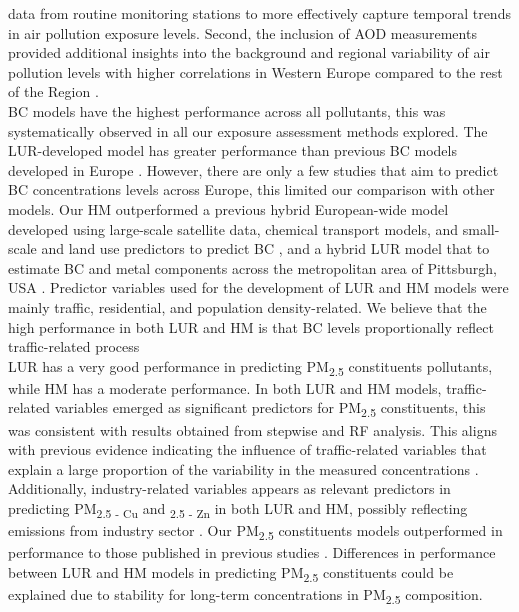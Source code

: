 \documentclass{article}
\begin{document}
data from routine monitoring stations to more effectively capture temporal trends in air pollution exposure levels. Second, the inclusion of AOD measurements provided additional insights into the background and regional variability of air pollution levels with higher correlations in Western Europe compared to the rest of the Region \cite{chen2024}.\\

BC models have the highest performance across all pollutants, this was systematically observed in all our exposure assessment methods explored. 
The LUR-developed model has greater performance than previous BC models developed in Europe \cite{hoek2015, van2020}. However, there are only a few studies that aim to predict BC concentrations levels across Europe, this limited our comparison with other models. Our HM outperformed a previous hybrid European-wide model developed using large-scale satellite data, chemical transport models, and small-scale and land use predictors to predict BC \cite{dehoogh2018}, and a hybrid LUR model that 
to estimate BC and metal components across the metropolitan area of Pittsburgh, USA \cite{tripathy2019}. Predictor variables used for the development of LUR and HM models were mainly traffic, residential, and population density-related. We believe that the high performance in both LUR and HM is that BC levels proportionally reflect traffic-related process  \\ 

LUR has a very good performance in predicting PM\textsubscript{2.5} constituents pollutants, while HM has a moderate performance. In both LUR and HM models, traffic-related variables emerged as significant predictors for PM\textsubscript{2.5} constituents, this was consistent with results obtained from stepwise and RF analysis. This aligns with previous evidence indicating the influence of traffic-related variables that explain a large proportion of the variability in the measured concentrations \cite{dehoogh2013, chen2020}. Additionally, industry-related variables appears as relevant predictors in predicting PM\textsubscript{2.5 - Cu} and \textsubscript{2.5 - Zn} in both LUR and HM, possibly reflecting emissions from industry sector \cite{belis2013, chen2020}. Our PM\textsubscript{2.5} constituents models outperformed in performance to those published in previous studies \cite{}. Differences in performance between LUR and HM models in predicting PM\textsubscript{2.5} constituents could be explained due to stability for long-term concentrations in PM\textsubscript{2.5} composition.\\ 
\end{document}
